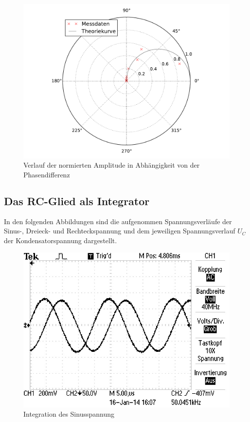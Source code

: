 	\begin{figure}[!h]
		\centering
		\includegraphics[scale=0.5]{Grafiken/Amplitude_Polar.pdf}
		\caption{Verlauf der normierten Amplitude in Abhängigkeit von der Phasendifferenz}
		\label{fig:Auswertung_Amplitude_Phase}
	\end{figure}
	 
\subsection{Das RC-Glied als Integrator}
	
	In den folgenden Abbildungen sind die aufgenommen Spannungsverläufe der Sinus-, Dreieck- und Rechteckspannung
	und dem jeweiligen Spannungsverlauf $U_{C}$ der Kondensatorspannung dargestellt.
	
	\begin{figure}[!h]
		\centering
		\includegraphics[scale=0.7]{Grafiken/Integrator_Sinus.jpg}
		\caption{Integration des Sinusspannung}
		\label{fig:Auswertung_Integrator_Sinus}
	\end{figure}
	
